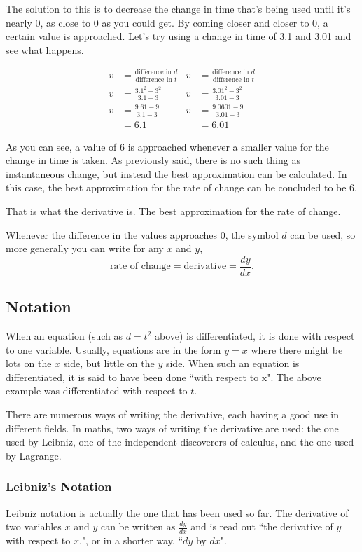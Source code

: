 The solution to this is to decrease the change in time that's being used until it's nearly $0$, as close to $0$ as you could get. By coming closer and closer to 0, a certain value is approached. Let's try using a change in time of 3.1 and 3.01 and see what happens.

\begin{align*}
	v&=\frac{\text{difference in $d$}}{\text{difference in $t$}} & v&=\frac{\text{difference in $d$}}{\text{difference in $t$}}\\[0.75em]
	v &= \frac{3.1^2 - 3^2}{3.1-3} & v &= \frac{3.01^2 - 3^2}{3.01-3}\\[0.75em]
	v &= \frac{9.61-9}{3.1-3} & v &= \frac{9.0601-9}{3.01-3}\\
	&= 6.1 & &= 6.01
\end{align*}

As you can see, a value of $6$ is approached whenever a smaller value for the change in time is taken. As previously said, there is no such thing as instantaneous change, but instead the best approximation can be calculated. In this case, the best approximation for the rate of change can be concluded to be $6$.

That is what the derivative is. The best approximation for the rate of change.

Whenever the difference in the values approaches $0$, the symbol $d$ can be used, so more generally you can write for any $x$ and $y$,
\begin{equation}
	\text{rate of change} = \text{derivative} = \frac{dy}{dx}\text{.}
\end{equation}

\subsection{Notation}
When an equation (such as $d=t^2$ above) is differentiated, it is done with respect to one variable. Usually, equations are in the form $y=x$ where there might be lots on the $x$ side, but little on the $y$ side. When such an equation is differentiated, it is said to have been done ``with respect to x". The above example was differentiated with respect to $t$.

There are numerous ways of writing the derivative, each having a good use in different fields. In maths, two ways of writing the derivative are used: the one used by Leibniz, one of the independent discoverers of calculus, and the one used by Lagrange.

\subsubsection{Leibniz's Notation}
Leibniz notation is actually the one that has been used so far. The derivative of two variables $x$ and $y$ can be written as $\frac{dy}{dx}$ and is read out ``the derivative of $y$ with respect to $x$.", or in a shorter way, ``$dy$ by $dx$".
